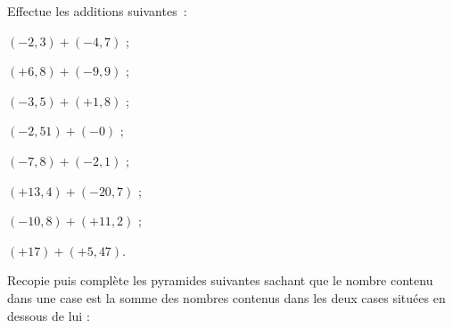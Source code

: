 \begin{exercice}
Effectue les additions suivantes :
\begin{colenumerate}{2}
 \item $(-2,3) + (-4,7)$ ;
 \item $(+6,8) + (-9,9)$ ;
 \item $(-3,5) + (+1,8)$ ;
 \item $(-2,51) + (-0)$ ;
 \item $(-7,8) + (-2,1)$ ;
 \item $(+13,4) + (-20,7)$ ;
 \item $(-10,8) + (+11,2)$ ;
 \item $(+17) + (+5,47)$.
 \end{colenumerate}
\end{exercice}


\begin{exercice}[La pyramide]
Recopie puis complète les pyramides suivantes sachant que le nombre contenu dans une case est la somme des nombres contenus dans les deux cases situées en dessous de lui :

\begin{minipage}[c]{0.48\linewidth}
\begin{center} \boxed{\phantom{hello}} \end{center}
\vspace{-0.69cm}
\begin{center} \boxed{\phantom{hello}} \negthinspace \boxed{\phantom{hello}} \end{center}
\vspace{-0.71cm}
\begin{center} \boxed{\phantom{hello}} \negthinspace \boxed{\phantom{hello}} \negthinspace  \boxed{\phantom{hello}} \end{center}
\vspace{-0.71cm}
\begin{center} \negthinspace {} \negthinspace {} \negthinspace {} \negthinspace {} \end{center}
 \end{minipage} \hfill%
 \begin{minipage}[c]{0.48\linewidth}
\begin{center} \boxed{\phantom{hello}} \end{center}
\vspace{-0.69cm}
\begin{center} \boxed{\phantom{hello}} \negthinspace \boxed{\phantom{hello}} \end{center}
\vspace{-0.71cm}
\begin{center} \boxed{\phantom{hello}} \negthinspace \boxed{\phantom{hello}} \negthinspace \boxed{\phantom{hello}} \end{center}
\vspace{-0.71cm}
\begin{center}  \negthinspace {} \negthinspace {} \negthinspace {} \end{center}
  \end{minipage} \\
\end{exercice}


